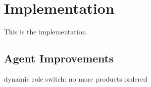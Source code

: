 \chapter{Implementation}

This is the implementation.

\section{Agent Improvements}
dynamic role switch: no more products ordered
